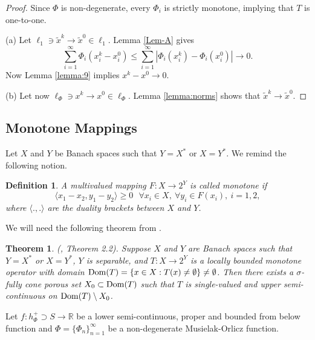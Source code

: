 \documentclass[12pt]{article}
\theoremstyle{thmstyleone}%
\newtheorem{theorem}{Theorem}
\theoremstyle{thmstyletwo}%
\theoremstyle{thmstylethree}%
\newtheorem{definition}{Definition}%
\begin{document}
{{{\begin{proof} Since $\Phi$ is non-degenerate, every $\Phi_i$ is strictly monotone, implying that  $T$ is one-to-one. 

(a) Let $\ell_1\ni \tilde x^k \rightarrow \tilde x^0\in \ell_1$. Lemma \ref{Lem-A} gives
$$
\sum_{i=1}^\infty \Phi_i(x_i^k-x_i^0)\le
\sum_{i=1}^\infty |\Phi_i(x_i^k) - \Phi_i(x_i^0)| \rightarrow 0.
$$
Now Lemma \ref{lemma:9} implies $x^k-x^0 \rightarrow 0$. 

(b) Let now $\ell_\Phi\ni x^k \rightarrow x^0\in \ell_\Phi$.
Lemma \ref{lemma:norms} shows that 
$\tilde x^k \rightarrow \tilde x^0$.
\end{proof}

}
 
\subsection{Monotone Mappings}%

Let $X$ and $Y$ be Banach spaces such that $Y = X^*$ or $X = Y^*$.
We remind the following notion. 

\begin{definition}\label{definition:10}%
	A multivalued mapping $F: X\rightarrow 2^Y$ is called monotone  if  
	\begin{equation}\label{equation:2}
		\langle x_1-x_2,y_1-y_2 \rangle \ge 0  \ \ \ \forall x_i\in X,\ \forall  y_i\in F(x_i), \ i=1,2,
	\end{equation}
	where $\langle.,.\rangle$ are the duality brackets between $X$ and $Y$.
\end{definition}
 

We will need the following theorem from   \cite{Ge}. 

\begin{theorem}(\cite{Ge}, Theorem 2.2)\label{theorem:6}. %
	Suppose $X$ and $Y$ are Banach spaces such that $Y = X^*$ or $X = Y^*$,  $Y$ is separable, and $T: X\rightarrow 2^{Y}$ is a locally bounded 
	monotone operator with domain ${\rm Dom}(T)=\{x\in X: T(x)\neq \emptyset\}\neq \emptyset$.
	Then there exists a {$\sigma$-fully cone porous} set $X_0\subset {\rm Dom}(T)$ such that $T$ is single-valued {and 
		upper semi-continuous} on ${\rm Dom}(T)\setminus X_0$.
\end{theorem}
 


Let $f:h_\Phi^+\supset S\rightarrow \mathbb{R}$ be a lower semi-continuous, proper and bounded from below function and  $\Phi=\{\Phi_n\}_{n=1}^\infty$ be a non-degenerate Musielak-Orlicz function. 

}}
\end{document}
